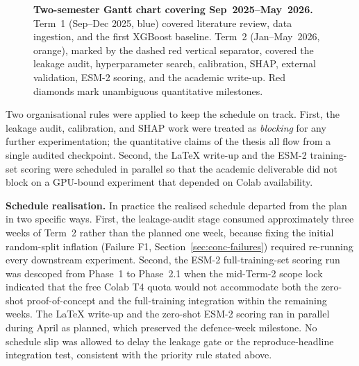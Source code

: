 \documentclass[11pt,a4paper,oneside]{report}
\begin{document}
\begin{figure}[htbp]
{}
\caption[Two-semester Gantt chart]{\textbf{Two-semester Gantt
chart covering Sep~2025--May~2026.} Term~1
(Sep--Dec 2025, blue) covered literature review, data
ingestion, and the first XGBoost baseline. Term~2
(Jan--May~2026, orange), marked by the dashed red vertical
separator, covered the leakage audit, hyperparameter search,
calibration, SHAP, external validation, ESM-2 scoring, and
the academic write-up. Red diamonds mark unambiguous
quantitative milestones.}
\label{fig:gantt}
\end{figure}

Two organisational rules were applied to keep the schedule
on track. First, the leakage audit, calibration, and SHAP
work were treated as \emph{blocking} for any further
experimentation; the quantitative claims of the thesis all
flow from a single audited checkpoint. Second, the LaTeX
write-up and the ESM-2 training-set scoring were scheduled
in parallel so that the academic deliverable did not block
on a GPU-bound experiment that depended on Colab availability.

\textbf{Schedule realisation.} In practice the realised
schedule departed from the plan in two specific ways. First,
the leakage-audit stage consumed approximately three weeks of
Term~2 rather than the planned one week, because fixing the
initial random-split inflation (Failure F1,
Section~\ref{sec:conc-failures}) required re-running every
downstream experiment. Second, the ESM-2 full-training-set
scoring run was descoped from Phase~1 to Phase~2.1 when the
mid-Term-2 scope lock indicated that the free Colab T4 quota
would not accommodate both the zero-shot proof-of-concept and
the full-training integration within the remaining weeks. The
LaTeX write-up and the zero-shot ESM-2 scoring ran in parallel
during April as planned, which preserved the defence-week
milestone. No schedule slip was allowed to delay the leakage
gate or the reproduce-headline integration test, consistent
with the priority rule stated above.
\end{document}
